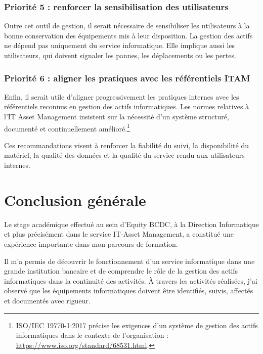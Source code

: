 \documentclass[12pt,a4paper]{report}
\begin{document}
\subsection{Priorité 5 : renforcer la sensibilisation des utilisateurs}

Outre cet outil de gestion, il serait nécessaire de sensibiliser les utilisateurs à la bonne conservation des équipements mis à leur disposition. La gestion des actifs ne dépend pas uniquement du service informatique. Elle implique aussi les utilisateurs, qui doivent signaler les pannes, les déplacements ou les pertes.

\subsection{Priorité 6 : aligner les pratiques avec les référentiels ITAM}

Enfin, il serait utile d'aligner progressivement les pratiques internes avec les référentiels reconnus en gestion des actifs informatiques. Les normes relatives à l'IT Asset Management insistent sur la nécessité d'un système structuré, documenté et continuellement amélioré.\footnote{ISO/IEC 19770-1:2017 précise les exigences d'un système de gestion des actifs informatiques dans le contexte de l'organisation : \url{https://www.iso.org/standard/68531.html}.}

Ces recommandations visent à renforcer la fiabilité du suivi, la disponibilité du matériel, la qualité des données et la qualité du service rendu aux utilisateurs internes.

\chapter*{Conclusion générale}

Le stage académique effectué au sein d'Equity BCDC, à la Direction Informatique et plus précisément dans le service IT-Asset Management, a constitué une expérience importante dans mon parcours de formation.

Il m'a permis de découvrir le fonctionnement d'un service informatique dans une grande institution bancaire et de comprendre le rôle de la gestion des actifs informatiques dans la continuité des activités. À travers les activités réalisées, j'ai observé que les équipements informatiques doivent être identifiés, suivis, affectés et documentés avec rigueur.
\end{document}
